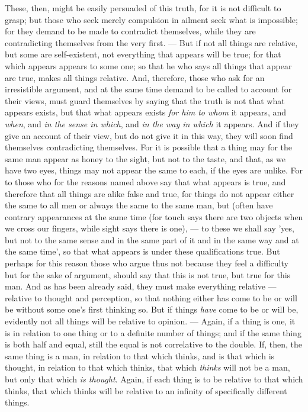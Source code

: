 These, then, might be easily persuaded of this truth, for it is not difficult to grasp; but those who seek merely compulsion in ailment seek what is impossible; for they demand to be made to contradict themselves, while they are contradicting themselves from the very first. — But if not all things are relative, but some are self-existent, not everything that appears will be true; for that which appears appears to some one; so that he who says all things that appear are true, makes all things relative. And, therefore, those who ask for an irresistible argument, and at the same time demand to be called to account for their views, must guard themselves by saying that the truth is not that what appears exists, but that what appears exists \emph{for him to whom} it appears, and \emph{when}, and \emph{in the sense in which}, and \emph{in the way in which} it appears. And if they give an account of their view, but do not give it in this way, they will soon find themselves contradicting themselves. For it is possible that a thing may for the same man appear as honey to the sight, but not to the taste, and that, as we have two eyes, things may not appear the same to each, if the eyes are unlike. For to those who for the reasons named above say that what appears is true, and therefore that all things are alike false and true, for things do not appear either the same to all men or always the same to the same man, but (often have contrary appearances at the same time (for touch says there are two objects when we cross our fingers, while sight says there is one), — to these we shall say 'yes, but not to the same sense and in the same part of it and in the same way and at the same time', so that what appears is under these qualifications true. But perhaps for this reason those who argue thus not because they feel a difficulty but for the sake of argument, should say that this is not true, but true for this man. And as has been already said, they must make everything relative — relative to thought and perception, so that nothing either has come to be or will be without some one's first thinking so. But if things \emph{have} come to be or will be, evidently not all things will be relative to opinion. — Again, if a thing is one, it is in relation to one thing or to a definite number of things; and if the same thing is both half and equal, still the equal is not correlative to the double. If, then, the same thing is a man, in relation to that which thinks, and is that which is thought, in relation to that which thinks, that which \emph{thinks} will not be a man, but only that which \emph{is thought}. Again, if each thing is to be relative to that which thinks, that which thinks will be relative to an infinity of specifically different things.

